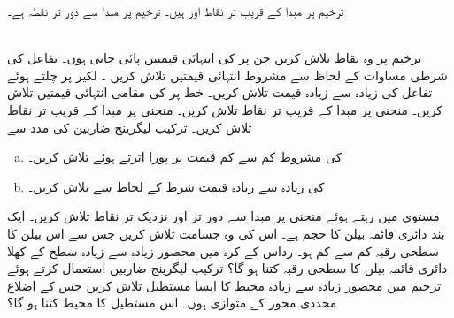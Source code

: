 ترخیم پر مبدا کے قریب تر  نقاط  اور  ہیں۔ ترخیم پر مبدا سے دور تر نقطہ  ہے۔

\\
ترخیم  پر وہ نقاط تلاش  کریں جن پر  کی انتہائی قیمتیں پائی جاتی ہوں۔
تفاعل   کی شرطی مساوات   کے لحاظ سے   مشروط انتہائی  قیمتیں تلاش کریں ۔
 لکیر  پر چلتے ہوئے  تفاعل  کی زیادہ سے زیادہ قیمت تلاش کریں۔
خط  پر   کی مقامی  انتہائی قیمتیں تلاش کریں۔
منحنی  پر مبدا کے  قریب تر نقاط تلاش کریں۔
منحنی  پر مبدا کے قریب تر نقاط تلاش کریں۔
ترکیب لیگرینج ضاربین کی مدد سے 
\begin{enumerate}[a.]
\item
{} کی مشروط کم سے کم  قیمت    پر پورا اترتے ہوئے تلاش کریں۔ 
\item
{} کی زیادہ سے زیادہ قیمت شرط     کے لحاظ سے تلاش کریں۔
\end{enumerate}
مستوی  میں رہتے ہوئے منحنی  پر مبدا  سے دور تر اور نزدیک تر نقاط تلاش کریں۔
ایک بند دائری قائمہ  بیلن کا حجم  ہے۔ اس کی وہ جسامت تلاش کریں جس سے اس بیلن کا سطحی رقبہ کم سے کم ہو۔
رداس  کے کرہ میں محصور   زیادہ سے زیادہ سطح کے  کھلا دائری قائمہ بیلن  کا سطحی رقبہ کتنا ہو گا؟ 
ترکیب لیگرینج ضاربین استعمال کرتے ہوئے  ترخیم   میں   محصور  زیادہ سے زیادہ محیط کا ایسا    مستطیل  تلاش کریں  جس کے اضلاع محددی محور کے متوازی ہوں۔ اس مستطیل کا محیط کتنا ہو گا؟ 
